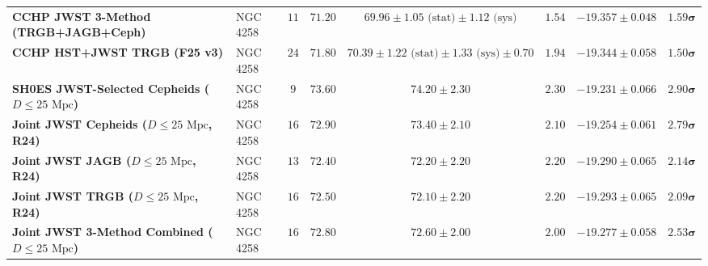\documentclass[11pt,letterpaper]{article}
\begin{document}
\begin{table}[!htbp]
{\begin{tabular}{llcccccc}
\textbf{CCHP JWST 3-Method (TRGB+JAGB+Ceph)} & NGC 4258 & $11$ & $71.20$ & $69.96 \pm 1.05\text{ (stat)} \pm 1.12\text{ (sys)}$ & $1.54$ & $-19.357 \pm 0.048$ & $\mathbf{1.59}\boldsymbol{\sigma}$ \\
\textbf{CCHP HST+JWST TRGB (F25 v3)} & NGC 4258 & $24$ & $71.80$ & $70.39 \pm 1.22\text{ (stat)} \pm 1.33\text{ (sys)} \pm 0.70$ & $1.94$ & $-19.344 \pm 0.058$ & $\mathbf{1.50}\boldsymbol{\sigma}$ \\
\midrule
\textbf{SH0ES JWST-Selected Cepheids ($D \le 25\text{ Mpc}$)} & NGC 4258 & $9$ & $73.60$ & $74.20 \pm 2.30$ & $2.30$ & $-19.231 \pm 0.066$ & $\mathbf{2.90}\boldsymbol{\sigma}$ \\
\textbf{Joint JWST Cepheids ($D \le 25\text{ Mpc}$, R24)} & NGC 4258 & $16$ & $72.90$ & $73.40 \pm 2.10$ & $2.10$ & $-19.254 \pm 0.061$ & $\mathbf{2.79}\boldsymbol{\sigma}$ \\
\textbf{Joint JWST JAGB ($D \le 25\text{ Mpc}$, R24)} & NGC 4258 & $13$ & $72.40$ & $72.20 \pm 2.20$ & $2.20$ & $-19.290 \pm 0.065$ & $\mathbf{2.14}\boldsymbol{\sigma}$ \\
\textbf{Joint JWST TRGB ($D \le 25\text{ Mpc}$, R24)} & NGC 4258 & $16$ & $72.50$ & $72.10 \pm 2.20$ & $2.20$ & $-19.293 \pm 0.065$ & $\mathbf{2.09}\boldsymbol{\sigma}$ \\
\textbf{Joint JWST 3-Method Combined ($D \le 25\text{ Mpc}$)} & NGC 4258 & $16$ & $72.80$ & $\mathbf{72.60 \pm 2.00}$ & $2.00$ & $-19.277 \pm 0.058$ & $\mathbf{2.53}\boldsymbol{\sigma}$ \\
\bottomrule
\end{tabular}%
}
\end{table}
\end{document}

